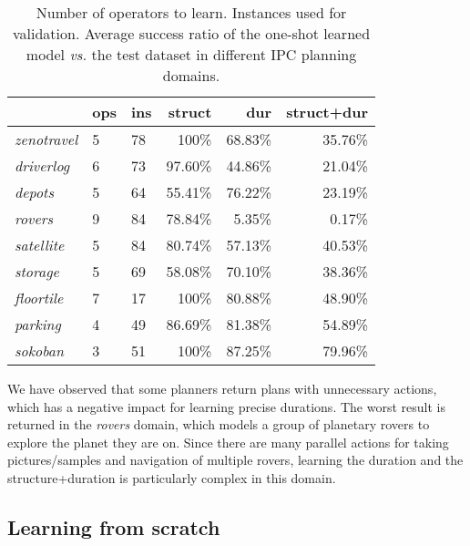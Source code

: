 \documentclass{ecai}
\begin{document}
\begin{table}
\begin{scriptsize}
\begin{tabular}{l|llrrr}
& {\bf ops} & {\bf ins} & {\bf struct} & {\bf dur} & {\bf struct+dur}  \\\hline

\emph{zenotravel} & 5 & 78 & 100\% & 68.83\% & 35.76\% \\
\emph{driverlog} & 6 & 73 & 97.60\% & 44.86\% & 21.04\% \\
\emph{depots} & 5 & 64 & 55.41\% & 76.22\% & 23.19\% \\
\emph{rovers} & 9 & 84 & 78.84\% & 5.35\% & 0.17\% \\
\emph{satellite} & 5 & 84 & 80.74\% & 57.13\% & 40.53\% \\
\emph{storage} & 5 & 69 & 58.08\% & 70.10\% & 38.36\% \\
\emph{floortile} & 7 & 17 & 100\% & 80.88\% & 48.90\%\\
\emph{parking} & 4 & 49 & 86.69\% & 81.38\% & 54.89\% \\
\emph{sokoban} & 3 & 51 & 100\% & 87.25\% & 79.96\% \\

\end{tabular}
\end{scriptsize}
\caption{\small Number of operators to learn. Instances used for validation. Average success ratio of the one-shot learned model \emph{vs.} the test dataset in different IPC planning domains.}
\label{table:evaluationExperiments}
\end{table}


We have observed that some planners return plans with unnecessary actions, which has a negative impact for learning precise durations.
The worst result is returned in the \emph{rovers} domain, which models a group of planetary rovers to explore the planet they are on. Since there are many parallel actions for taking pictures/samples and navigation of multiple rovers, learning the duration and the structure+duration is particularly complex in this domain.

\subsection{Learning from scratch}
\end{document}
